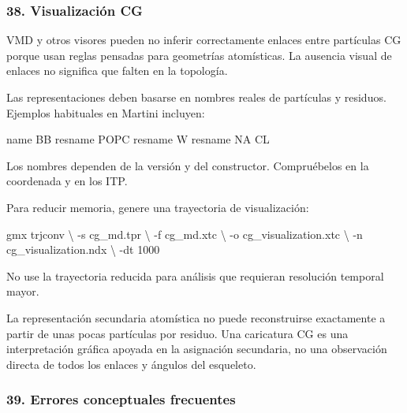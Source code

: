 \documentclass[
  spanish,
  11pt,
  a4paper]{article}
\newenvironment{Shaded}{\begin{snugshade}}{\end{snugshade}}
\newcommand{\AttributeTok}[1]{\textcolor[rgb]{0.13,0.29,0.53}{#1}}
\newcommand{\DataTypeTok}[1]{\textcolor[rgb]{0.13,0.29,0.53}{#1}}
\newcommand{\ExtensionTok}[1]{#1}
\newcommand{\NormalTok}[1]{#1}
\begin{document}
\subsubsection{38. Visualización CG}\label{visualizaciuxf3n-cg}

VMD y otros visores pueden no inferir correctamente enlaces entre
partículas CG porque usan reglas pensadas para geometrías atomísticas.
La ausencia visual de enlaces no significa que falten en la topología.

Las representaciones deben basarse en nombres reales de partículas y
residuos. Ejemplos habituales en Martini incluyen:

\begin{Shaded}
\begin{Highlighting}[]
\NormalTok{name BB}
\NormalTok{resname POPC}
\NormalTok{resname W}
\NormalTok{resname NA CL}
\end{Highlighting}
\end{Shaded}

Los nombres dependen de la versión y del constructor. Compruébelos en la
coordenada y en los ITP.

Para reducir memoria, genere una trayectoria de visualización:

\begin{Shaded}
\begin{Highlighting}[]
\ExtensionTok{gmx}\NormalTok{ trjconv }\DataTypeTok{\textbackslash{}}
    \AttributeTok{{-}s}\NormalTok{ cg\_md.tpr }\DataTypeTok{\textbackslash{}}
    \AttributeTok{{-}f}\NormalTok{ cg\_md.xtc }\DataTypeTok{\textbackslash{}}
    \AttributeTok{{-}o}\NormalTok{ cg\_visualization.xtc }\DataTypeTok{\textbackslash{}}
    \AttributeTok{{-}n}\NormalTok{ cg\_visualization.ndx }\DataTypeTok{\textbackslash{}}
    \AttributeTok{{-}dt}\NormalTok{ 1000}
\end{Highlighting}
\end{Shaded}

No use la trayectoria reducida para análisis que requieran resolución
temporal mayor.

La representación secundaria atomística no puede reconstruirse
exactamente a partir de unas pocas partículas por residuo. Una
caricatura CG es una interpretación gráfica apoyada en la asignación
secundaria, no una observación directa de todos los enlaces y ángulos
del esqueleto.

\subsubsection{39. Errores conceptuales
frecuentes}\label{errores-conceptuales-frecuentes}
\end{document}
